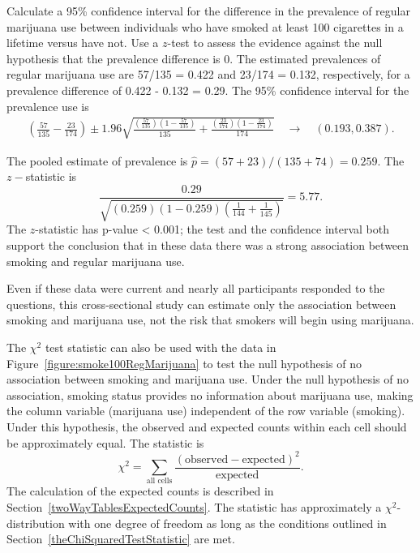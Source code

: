 \begin{examplewrap}
\begin{nexample}{Calculate a 95\% confidence interval for the difference in the prevalence of regular marijuana use between individuals who have smoked at least 100 cigarettes in a lifetime versus have not. Use a $z$-test to assess the evidence against the null hypothesis that the prevalence difference is 0.}
The estimated prevalences of regular marijuana use are 57/135 = 0.422 and 23/174 = 0.132, respectively, for a prevalence difference of 0.422 - 0.132 = 0.29.  The 95\% confidence interval for the prevalence use is
\begin{align*}
   \left( \frac{57}{135} - \frac{23}{174} \right) \pm 1.96  \sqrt{\frac{(\frac{57}{135} )
   (1 - \frac{57}{135} )}{135}
   + \frac{(\frac{23}{174})(1 - \frac{23}{174})}{174}} \quad \to \quad (0.193, 0.387).
\end{align*}

The pooled estimate of prevalence is  $\hat{p} = (57 + 23)/(135 + 74) = 0.259$.  The $z-$statistic is
\[
   \frac{0.29}{\sqrt{(0.259)(1 - 0.259)\left(\frac{1}{144} + \frac{1}{145} \right)}} = 5.77.
\]
The $z$-statistic has p-value < 0.001; the test and the confidence interval both support the conclusion that in these data there was a strong association between smoking and regular marijuana use.
\end{nexample}
\end{examplewrap}

Even if these data were current and nearly all participants responded to the questions, this cross-sectional study can estimate only the association between smoking and marijuana use, not the risk that smokers will begin using marijuana.

The $\chi^2$ test statistic can also be used with the data in Figure~\ref{figure:smoke100RegMarijuana} to test the null hypothesis of no association between smoking and marijuana use. Under the null hypothesis of no association, smoking status provides no information about marijuana use, making the column variable (marijuana use) independent of the row variable (smoking). Under this hypothesis, the observed and expected counts within each cell should be approximately equal.  The statistic is
\[
\chi^2 = \sum_{\text{all cells}} \frac{(\text{observed} - \text{expected})^2}{\text{expected}}.
\]
The calculation of the expected counts is described in Section~\ref{twoWayTablesExpectedCounts}.
The statistic has approximately a $\chi^2$-distribution with one degree of freedom as long as the conditions outlined in Section~\ref{theChiSquaredTestStatistic} are met.

